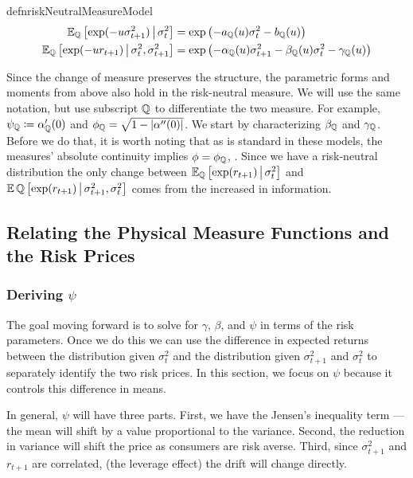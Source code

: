 \documentclass[11pt, letterpaper, twoside, final]{article}
\begin{document}
\begin{restatable}{defn}{riskNeutralMeasureModel}
    \label{defn:risk_neutral_model}
    \begin{align}
        \E_{\QQ} \left[\exp(-u \sigma^2_{t+1}) \mvert \sigma^2_t \right] &= \exp\left( - a_{\QQ}(u) \sigma^2_t -
        b_{\QQ}(u) \right) \\
        \E_{\QQ}\left[\exp(-u r_{t+1}) \mvert \sigma^2_t,  \sigma^2_{t+1}\right] &= \exp\left(- \alpha_{\QQ}(u)
        \sigma^2_{t+1} - \beta_{\QQ}(u)\sigma^2_t - \gamma_{\QQ}(u) \right) 
    \end{align}
\end{restatable}


Since the change of measure preserves the structure, the parametric forms and moments from above also hold in the
risk-neutral measure.
We will use the same notation, but use subscript $\QQ$ to differentiate the two measure. 
For example, $\psi_{\QQ} \coloneqq \alpha_{\QQ}'(0)$ and $\phi_{\QQ} = \sqrt{1 - \abs*{\alpha''(0)}}$.
We start by characterizing $\beta_{\QQ}$ and $\gamma_{\QQ}$.
Before we do that, it is worth noting that as is standard in these models, the measures' absolute continuity
implies $\phi = \phi_{\QQ}$, \parencite[17]{khrapov2016affine}.
Since we have a risk-neutral distribution the only change between $\E_{\QQ}\left[\exp(r_{t+1}) \mvert
\sigma^2_t\right]$ and $\E{\QQ}\left[\exp(r_{t+1}) \mvert \sigma^2_{t+1}, \sigma^2_t\right]$ comes from the
increased in information.

\subsection{Relating the Physical Measure Functions and the Risk Prices}

\subsubsection{Deriving \texorpdfstring{$\psi$}{psi}}

The goal moving forward is to solve for $\gamma$, $\beta$, and $\psi$ in terms of the risk parameters. 
Once we do this we can use the difference in expected returns between the distribution given $\sigma^2_t$ and the
distribution given $\sigma^2_{t+1}$ and $\sigma^2_t$ to separately identify the two risk prices.
In this section, we focus on $\psi$ because it controls this difference in means.

In general, $\psi$ will have three parts.
First, we have the Jensen's inequality term --- the mean will shift by a value proportional to the variance.
Second, the reduction in variance will shift the price as consumers are risk averse.
Third, since $\sigma^2_{t+1}$ and $r_{t+1}$ are correlated, (the leverage effect) the drift will change directly. 
\end{document}
